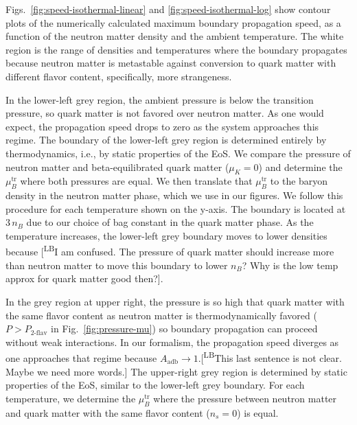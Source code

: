 \documentclass[10pt,superscriptaddress,
amsmath,aps,prc,twocolumn,nofootinbib,floatfix]{revtex4-1}
\newcommand{\mga}[1]{{\color[rgb]{0.6,0,0}#1}}
\newcommand{\mgacom}[1]{\textsf{\color[rgb]{0.8,0,0}[\textsuperscript{MGA} #1]}}
\newcommand{\LB}[1]{{\color{blue}#1}}
\newcommand{\LBcom}[1]{\textsf{\color{blue}[\textsuperscript{LB}#1]}}
\begin{document}
\mga{
Figs.~\ref{fig:speed-isothermal-linear} and \ref{fig:speed-isothermal-log} show contour plots of the numerically calculated maximum boundary propagation speed, as a function of the neutron matter density and the ambient temperature.
The white region is the range of densities and temperatures where the boundary propagates because neutron matter is metastable against conversion to quark matter with different flavor content, specifically, more strangeness. 

In the lower-left grey region, the ambient pressure is below the transition pressure, so quark matter is not favored over neutron matter. As one would expect, the propagation speed drops to zero as the system approaches this regime. 
\LB{The boundary of the lower-left grey region is determined entirely by thermodynamics, i.e., by static properties of the EoS. We compare the pressure of neutron matter and beta-equilibrated quark matter ($\mu_K=0$) and determine the $\mu_B^{\text{tr}}$ where both pressures are equal. We then translate that $\mu_B^{\text{tr}}$ to the baryon density in the neutron matter phase, which we use in our figures. We follow this procedure for each temperature shown on the y-axis.
The boundary is located at $3\,n_B$ due to our choice of bag constant in the quark matter phase. As the temperature increases, the lower-left grey boundary moves to lower densities because \LBcom{I am confused. The pressure of quark matter should increase more than neutron matter to move this boundary to lower $n_B$? Why is the low temp approx for quark matter good then?}}.

In the grey region at upper right, the pressure is so high that quark matter with the same flavor content as neutron matter is thermodynamically favored ($P>P_\text{2-flav}$ in Fig.~\ref{fig:pressure-mu}) so boundary propagation can proceed without weak interactions. In our formalism, the propagation speed diverges as one approaches that regime because $A_\text{adb}\to 1$.\LBcom{This last sentence is not clear. Maybe we need more words.}
\LB{The upper-right grey region is determined by static properties of the EoS, similar to the lower-left grey boundary. For each temperature, we determine the $\mu_B^{\text{tr}}$ where the pressure between neutron matter and quark matter with the same flavor content ($n_s=0$) is equal.}


}
\end{document}
